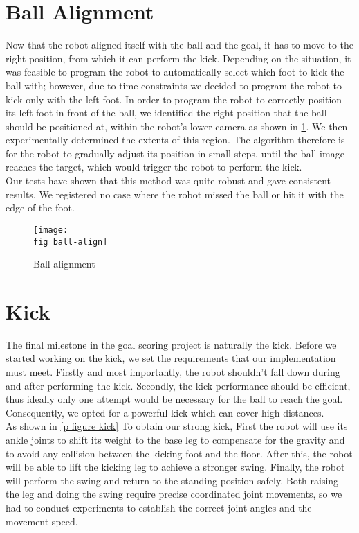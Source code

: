 \section{Ball Alignment}

Now that the robot aligned itself with the ball and the goal, it has to move to the
right position, from which it can perform the kick. Depending on the situation, it
was feasible to program the robot to automatically select which foot to kick the ball with;
however, due to time constraints we decided to program the robot to kick only with the left foot.
In order to program the robot to correctly position its left foot in front of the ball,
we identified the right position that the ball should be positioned at,
within the robot’s lower camera as shown in \ref{p figure ball-alignment}.
We then experimentally determined the extents of this region.
The algorithm therefore is for the robot to gradually adjust its position in small steps,
until the ball image reaches the target, which would trigger the robot to perform the kick. \\
Our tests have shown that this method was quite robust and gave consistent results.
We registered no case where the robot missed the ball or hit it with the edge of the foot.\\

\begin{figure}[ht]
  \texttt{[image: \\fig ball-align]}
  \caption{Ball alignment}
  \label{p figure ball-alignment}
\end{figure}


\section{Kick}

The final milestone in the goal scoring project is naturally the kick. Before
we started working on the kick, we set the requirements that our
implementation must meet. Firstly and most importantly, the robot shouldn't
fall down during and after performing the kick. Secondly, the kick performance should be efficient,
thus ideally only one attempt would be necessary for the ball to reach the goal.
Consequently, we opted for a powerful kick which can cover high distances. \\

As shown in \ref{p figure kick} To obtain our strong kick, First the robot will use its ankle joints to shift
its weight to the base leg to compensate for the gravity and to avoid any collision between the kicking foot and the floor.
After this, the robot will be able to lift the
kicking leg to achieve a stronger swing. Finally, the robot will perform the swing and return
to the standing position safely. Both raising the leg and doing the swing require
precise coordinated joint movements, so we had to conduct experiments to
establish the correct joint angles and the movement speed. \\

